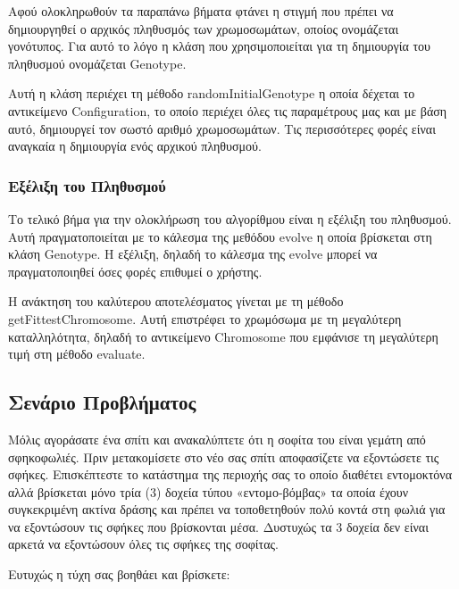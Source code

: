 Αφού ολοκληρωθούν τα παραπάνω βήματα φτάνει η στιγμή που πρέπει να δημιουργηθεί ο αρχικός πληθυσμός των χρωμοσωμάτων, οποίος ονομάζεται γονότυπος. Για αυτό το λόγο η κλάση που χρησιμοποιείται για τη δημιουργία του πληθυσμού ονομάζεται Genotype.

Αυτή η κλάση περιέχει τη μέθοδο randomInitialGenotype η οποία δέχεται το αντικείμενο Configuration, το οποίο περιέχει όλες τις παραμέτρους μας και με βάση αυτό, δημιουργεί τον σωστό αριθμό χρωμοσωμάτων. Τις περισσότερες φορές είναι αναγκαία η δημιουργία ενός αρχικού πληθυσμού.

\subsubsection{Εξέλιξη του Πληθυσμού}

Το τελικό βήμα για την ολοκλήρωση του αλγορίθμου είναι η εξέλιξη του πληθυσμού. Αυτή πραγματοποιείται με το κάλεσμα της μεθόδου evolve η οποία βρίσκεται στη κλάση Genotype. Η εξέλιξη, δηλαδή το κάλεσμα της evolve μπορεί να πραγματοποιηθεί όσες φορές επιθυμεί ο χρήστης.

Η ανάκτηση του καλύτερου αποτελέσματος γίνεται με τη μέθοδο getFittestChromosome. Αυτή επιστρέφει το χρωμόσωμα με τη μεγαλύτερη καταλληλότητα, δηλαδή το αντικείμενο Chromosome που εμφάνισε τη μεγαλύτερη τιμή στη μέθοδο evaluate.

\subsection{Σενάριο Προβλήματος}

Μόλις αγοράσατε ένα σπίτι και ανακαλύπτετε ότι η σοφίτα του είναι γεμάτη από σφηκοφωλιές. Πριν μετακομίσετε στο νέο σας σπίτι αποφασίζετε να εξοντώσετε τις σφήκες. Επισκέπτεστε το κατάστημα της περιοχής σας το οποίο διαθέτει εντομοκτόνα αλλά βρίσκεται μόνο τρία (3) δοχεία τύπου «εντομο-βόμβας» τα οποία έχουν συγκεκριμένη
ακτίνα δράσης και πρέπει να τοποθετηθούν πολύ κοντά στη φωλιά για να εξοντώσουν τις σφήκες που βρίσκονται μέσα. Δυστυχώς τα 3 δοχεία δεν είναι αρκετά να εξοντώσουν όλες τις σφήκες της σοφίτας. 

Ευτυχώς η τύχη σας βοηθάει και βρίσκετε:

